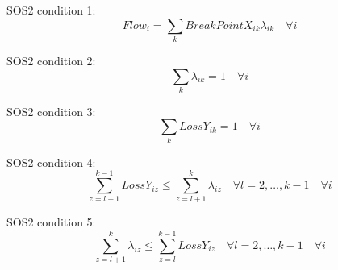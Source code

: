 \documentclass{article}
\begin{document}
SOS2 condition 1:
\begin{equation}
	Flow_{i} = \sum\limits_{k} BreakPointX_{ik} \lambda_{ik} \quad \forall i
\end{equation}

SOS2 condition 2:
\begin{equation}
	\sum\limits_{k} \lambda_{ik} = 1 \quad \forall i
\end{equation}

SOS2 condition 3:
\begin{equation}
	\sum\limits_{k} LossY_{ik} = 1 \quad \forall i
\end{equation}



SOS2 condition 4:
\begin{equation}
	\sum\limits_{z=l+1}^{k-1} LossY_{iz} \leq \sum\limits_{z=l+1}^{k} \lambda_{iz} \quad \forall l=2,\ldots,k-1 \quad \forall i
\end{equation}

%

SOS2 condition 5:
\begin{equation}
\sum\limits_{z=l+1}^{k} \lambda_{iz} \leq \sum\limits_{z=l}^{k-1} LossY_{iz} \quad \forall l=2,\ldots,k-1 \quad \forall i
\end{equation}

%
\end{document}
